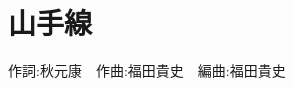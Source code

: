 \section{山手線}

\begin{center}
    \scriptsize{
        作詞:秋元康　作曲:福田貴史　編曲:福田貴史
    }
\end{center}

\vspace{0.7em}

\begin{Parallel}[c]{0.47\textwidth}{0.47\textwidth}

\ParallelLText{
    \footnotesize{
        
    }
}

\ParallelRText{
    \footnotesize{
        
    }
}

\end{Parallel}
